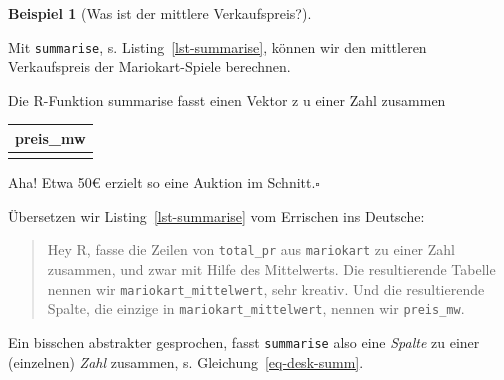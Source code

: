 \documentclass[
  letterpaper,
]{scrbook}
\newenvironment{Shaded}{\begin{snugshade}}{\end{snugshade}}
\newcommand{\AttributeTok}[1]{\textcolor[rgb]{0.40,0.45,0.13}{#1}}
\newcommand{\FunctionTok}[1]{\textcolor[rgb]{0.28,0.35,0.67}{#1}}
\newcommand{\NormalTok}[1]{\textcolor[rgb]{0.00,0.23,0.31}{#1}}
\newcommand{\OtherTok}[1]{\textcolor[rgb]{0.00,0.23,0.31}{#1}}
\theoremstyle{definition}
\newtheorem{example}{Beispiel}[chapter]
\theoremstyle{definition}
\theoremstyle{definition}
\theoremstyle{remark}
\begin{document}
\begin{example}[Was ist der mittlere
Verkaufspreis?]\protect\hypertarget{exm-summarise}{}\label{exm-summarise}

Mit \texttt{summarise}, s. Listing~\ref{lst-summarise}, können wir den
mittleren Verkaufspreis der Mariokart-Spiele berechnen.

\begin{codelisting}

\caption{\label{lst-summarise}Die R-Funktion summarise fasst einen
Vektor z u einer Zahl zusammen}

\centering{

\begin{Shaded}
\begin{Highlighting}[]
\NormalTok{mariokart\_mittelwert }\OtherTok{\textless{}{-}} \FunctionTok{summarise}\NormalTok{(mariokart,}
                                  \AttributeTok{preis\_mw =} \FunctionTok{mean}\NormalTok{(total\_pr))}
\NormalTok{mariokart\_mittelwert}
\end{Highlighting}
\end{Shaded}

}

\end{codelisting}%

\begin{longtable}[]{@{}r@{}}
\toprule\noalign{}
preis\_mw \\
\midrule\noalign{}
\endhead
\bottomrule\noalign{}
\endlastfoot
50 \\
\end{longtable}

Aha! Etwa 50€ erzielt so eine Auktion im Schnitt.\(\square\)

\end{example}

Übersetzen wir Listing~\ref{lst-summarise} vom Errischen ins Deutsche:

\begin{quote}
{} Hey R, fasse die Zeilen von \texttt{total\_pr} aus
\texttt{mariokart} zu einer Zahl zusammen, und zwar mit Hilfe des
Mittelwerts. Die resultierende Tabelle nennen wir
\texttt{mariokart\_mittelwert}, sehr kreativ. Und die resultierende
Spalte, die einzige in \texttt{mariokart\_mittelwert}, nennen wir
\texttt{preis\_mw}.
\end{quote}

Ein bisschen abstrakter gesprochen, fasst \texttt{summarise} also eine
\emph{Spalte} zu einer (einzelnen) \emph{Zahl} zusammen, s.
Gleichung~\ref{eq-desk-summ}.
\end{document}
